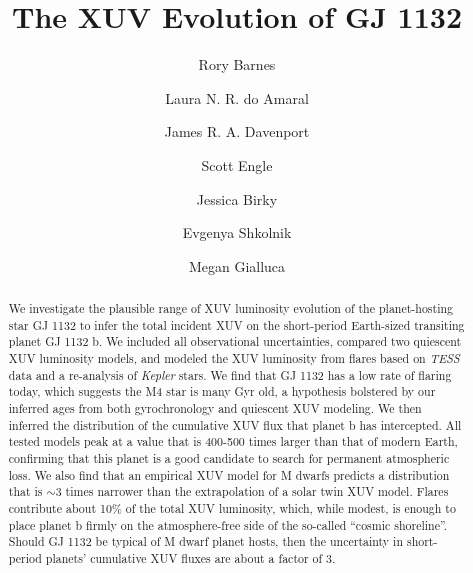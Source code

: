 \documentclass[preprint]{aastex631}
\def\tess{{\it TESS}\xspace}
\def\kepler{{\it Kepler}\xspace}
\begin{document}
\title{The XUV Evolution of GJ 1132}

\author[0000-0001-6487-5445]{Rory Barnes}

\author[0000-0002-8341-0376]{Laura N. R. do Amaral}

\author[0000-0002-0637-835X]{James R. A. Davenport}

\author[0000-0002-0637-835X]{Scott Engle}

\author[0000-0002-7961-6881]{Jessica Birky}

\author[0000-0002-0637-835X]{Evgenya Shkolnik}

\author{Megan Gialluca}

\begin{abstract}
    We investigate the plausible range of XUV luminosity evolution of the planet-hosting star GJ 1132 to infer the total incident XUV on the short-period Earth-sized transiting planet GJ 1132 b. We included all observational uncertainties, compared two quiescent XUV luminosity models, and modeled the XUV luminosity from flares based on \tess data and a re-analysis of \kepler stars. We find that GJ 1132 has a low rate of flaring today, which suggests the M4 star is many Gyr old, a hypothesis bolstered by our inferred ages from both gyrochronology and quiescent XUV modeling. We then inferred the distribution of the cumulative XUV flux that planet b has intercepted. All tested models peak at a value that is 400-500 times larger than that of modern Earth, confirming that this planet is a good candidate to search for permanent atmospheric loss. We also find that an empirical XUV model for M dwarfs predicts a distribution that is $\sim$3 times narrower than the extrapolation of a solar twin XUV model. Flares contribute about 10\% of the total XUV luminosity, which, while modest, is enough to place planet b firmly on the  atmosphere-free side of the so-called ``cosmic shoreline''. Should GJ 1132 be typical of M dwarf planet hosts, then the uncertainty in short-period planets' cumulative XUV fluxes are about a factor of 3.  
\end{abstract}
\end{document}
